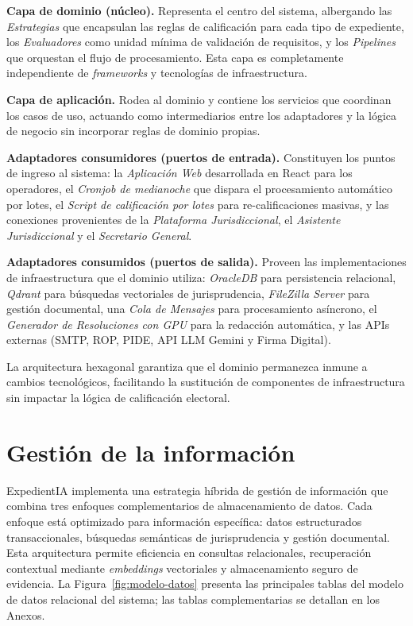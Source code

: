 \documentclass[12pt,a4paper,oneside]{book}
\begin{document}
\textbf{Capa de dominio (núcleo).} Representa el centro del sistema, albergando las \textit{Estrategias} que encapsulan las reglas de calificación para cada tipo de expediente, los \textit{Evaluadores} como unidad mínima de validación de requisitos, y los \textit{Pipelines} que orquestan el flujo de procesamiento. Esta capa es completamente independiente de \textit{frameworks} y tecnologías de infraestructura.

\textbf{Capa de aplicación.} Rodea al dominio y contiene los servicios que coordinan los casos de uso, actuando como intermediarios entre los adaptadores y la lógica de negocio sin incorporar reglas de dominio propias.

\textbf{Adaptadores consumidores (puertos de entrada).} Constituyen los puntos de ingreso al sistema: la \textit{Aplicación Web} desarrollada en React para los operadores, el \textit{Cronjob de medianoche} que dispara el procesamiento automático por lotes, el \textit{Script de calificación por lotes} para re-calificaciones masivas, y las conexiones provenientes de la \textit{Plataforma Jurisdiccional}, el \textit{Asistente Jurisdiccional} y el \textit{Secretario General}.

\textbf{Adaptadores consumidos (puertos de salida).} Proveen las implementaciones de infraestructura que el dominio utiliza: \textit{OracleDB} para persistencia relacional, \textit{Qdrant} para búsquedas vectoriales de jurisprudencia, \textit{FileZilla Server} para gestión documental, una \textit{Cola de Mensajes} para procesamiento asíncrono, el \textit{Generador de Resoluciones con GPU} para la redacción automática, y las APIs externas (SMTP, ROP, PIDE, API LLM Gemini y Firma Digital).

La arquitectura hexagonal garantiza que el dominio permanezca inmune a cambios tecnológicos, facilitando la sustitución de componentes de infraestructura sin impactar la lógica de calificación electoral.

\section{Gestión de la información}
\label{sec:gestion-informacion}

ExpedientIA implementa una estrategia híbrida de gestión de información que combina tres enfoques complementarios de almacenamiento de datos. Cada enfoque está optimizado para información específica: datos estructurados transaccionales, búsquedas semánticas de jurisprudencia y gestión documental. Esta arquitectura permite eficiencia en consultas relacionales, recuperación contextual mediante \textit{embeddings} vectoriales y almacenamiento seguro de evidencia. La Figura~\ref{fig:modelo-datos} presenta las principales tablas del modelo de datos relacional del sistema; las tablas complementarias se detallan en los Anexos.
\end{document}
